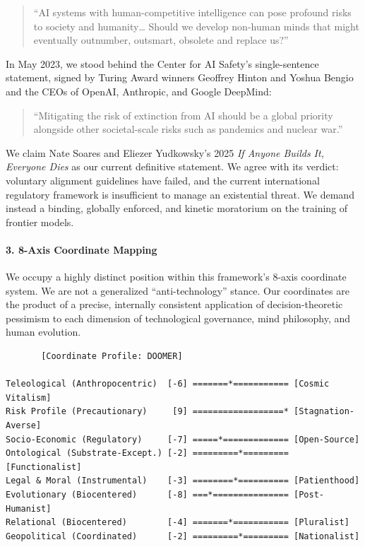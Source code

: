 \begin{quote}
``AI systems with human-competitive intelligence can pose profound risks
to society and humanity\ldots{} Should we develop non-human minds that
might eventually outnumber, outsmart, obsolete and replace us?''
\end{quote}

In May 2023, we stood behind the Center for AI Safety's single-sentence
statement, signed by Turing Award winners Geoffrey Hinton and Yoshua
Bengio and the CEOs of OpenAI, Anthropic, and Google DeepMind:

\begin{quote}
``Mitigating the risk of extinction from AI should be a global priority
alongside other societal-scale risks such as pandemics and nuclear
war.''
\end{quote}

We claim Nate Soares and Eliezer Yudkowsky's 2025 \emph{If Anyone Builds
It, Everyone Dies} as our current definitive statement. We agree with
its verdict: voluntary alignment guidelines have failed, and the current
international regulatory framework is insufficient to manage an
existential threat. We demand instead a binding, globally enforced, and
kinetic moratorium on the training of frontier models.

\paragraph{3. 8-Axis Coordinate Mapping}\label{axis-coordinate-mapping}

We occupy a highly distinct position within this framework's 8-axis
coordinate system. We are not a generalized ``anti-technology'' stance.
Our coordinates are the product of a precise, internally consistent
application of decision-theoretic pessimism to each dimension of
technological governance, mind philosophy, and human evolution.

\begin{verbatim}
       [Coordinate Profile: DOOMER]

Teleological (Anthropocentric)  [-6] =======*=========== [Cosmic Vitalism]
Risk Profile (Precautionary)     [9] ==================* [Stagnation-Averse]
Socio-Economic (Regulatory)     [-7] =====*============= [Open-Source]
Ontological (Substrate-Except.) [-2] =========*========= [Functionalist]
Legal & Moral (Instrumental)    [-3] ========*========== [Patienthood]
Evolutionary (Biocentered)      [-8] ===*=============== [Post-Humanist]
Relational (Biocentered)        [-4] =======*=========== [Pluralist]
Geopolitical (Coordinated)      [-2] =========*========= [Nationalist]
\end{verbatim}

